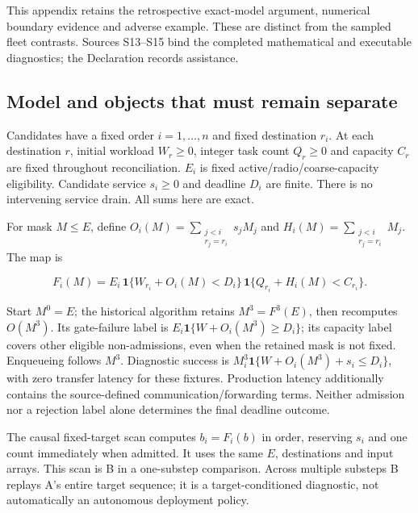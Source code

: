 \documentclass[12pt,a4paper]{article}
\begin{document}
This appendix retains the retrospective exact-model argument, numerical boundary evidence and adverse example. These are distinct from the sampled fleet contrasts. Sources S13--S15 bind the completed mathematical and executable diagnostics; the Declaration records assistance.

\FloatBarrier
\subsection{Model and objects that must remain separate}\label{sec:C.1}

Candidates have a fixed order $i=1,\ldots,n$ and fixed destination $r_i$. At each destination $r$, initial workload $W_r\geq0$, integer task count $Q_r\geq0$ and capacity $C_r$ are fixed throughout reconciliation. $E_i$ is fixed active/radio/coarse-capacity eligibility. Candidate service $s_i\geq0$ and deadline $D_i$ are finite. There is no intervening service drain. All sums here are exact.

For mask $M\leq E$, define $O_i(M)=\sum_{\substack{j<i\\r_j=r_i}}s_jM_j$ and $H_i(M)=\sum_{\substack{j<i\\r_j=r_i}}M_j$. The map is

\begin{equation}\tag{C1}\label{eq:C1}
 F_i(M)=E_i\,\mathbf{1}\{W_{r_i}+O_i(M)<D_i\}\,\mathbf{1}\{Q_{r_i}+H_i(M)<C_{r_i}\}.
\end{equation}

Start $M^{0}=E$; the historical algorithm retains $M^{3}=F^{3}(E)$, then recomputes $O(M^{3})$. Its gate-failure label is $E_i\mathbf{1}\{W+O_i(M^{3})\geq D_i\}$; its capacity label covers other eligible non-admissions, even when the retained mask is not fixed. Enqueueing follows $M^{3}$. Diagnostic success is $M_i^{3}\mathbf{1}\{W+O_i(M^{3})+s_i\leq D_i\}$, with zero transfer latency for these fixtures. Production latency additionally contains the source-defined communication/forwarding terms. Neither admission nor a rejection label alone determines the final deadline outcome.

The causal fixed-target scan computes $b_i=F_i(b)$ in order, reserving $s_i$ and one count immediately when admitted. It uses the same $E$, destinations and input arrays. This scan is B in a one-substep comparison. Across multiple substeps B replays A's entire target sequence; it is a target-conditioned diagnostic, not automatically an autonomous deployment policy.
\end{document}

